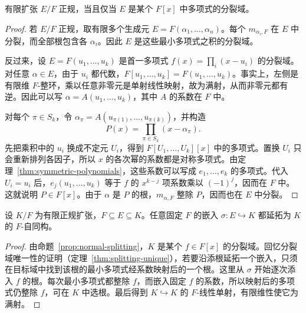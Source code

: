 \documentclass[lang=cn,a4paper,fontset=none,zihao=false,10pt,openany,twoside]{beautybook}
\numberwithin{algorithm}{chapter}
\begin{document}
\begin{proposition}[正规扩张的分裂域判别]\label{prop:normal-splitting}
有限扩张 $E/F$ 正规，当且仅当 $E$ 是某个 $F[x]$ 中多项式的分裂域。
\end{proposition}
\begin{proof}
若 $E/F$ 正规，取有限多个生成元 $E=F(\alpha_1,\dots,\alpha_n)$。每个 $m_{\alpha_i,F}$ 在 $E$ 中分裂，而全部根包含各 $\alpha_i$。因此 $E$ 是这些最小多项式之积的分裂域。

反过来，设 $E=F(u_1,\dots,u_k)$ 是首一多项式 $f(x)=\prod_i(x-u_i)$ 的分裂域。对任意 $\alpha\in E$，由于 $u_i$ 都代数，$F[u_1,\dots,u_k]=F(u_1,\dots,u_k)$。事实上，左侧是有限维 $F$-整环，乘以任意非零元是单射线性映射，故为满射，从而非零元都有逆。因此可以写 $\alpha=A(u_1,\dots,u_k)$，其中 $A$ 的系数在 $F$ 中。

对每个 $\pi\in S_k$，令 $\alpha_\pi=A(u_{\pi(1)},\dots,u_{\pi(k)})$，并构造
\[
 P(x)=\prod_{\pi\in S_k}(x-\alpha_\pi).
\]
先把乘积中的 $u_i$ 换成不定元 $U_i$，得到 $F[U_1,\dots,U_k][x]$ 中的多项式。置换 $U_i$ 只会重新排列各因子，所以 $x$ 的各次幂的系数都是对称多项式。由定理~\ref{thm:symmetric-polynomials}，这些系数可以写成 $e_1,\dots,e_k$ 的多项式。代入 $U_i=u_i$ 后，$e_j(u_1,\dots,u_k)$ 等于 $f$ 的 $x^{k-j}$ 项系数乘以 $(-1)^j$，因而在 $F$ 中。这就说明 $P\in F[x]$。由于 $\alpha$ 是 $P$ 的根，$m_{\alpha,F}$ 整除 $P$，因而也在 $E$ 中分裂。
\end{proof}

\begin{lemma}[分裂域中的嵌入延拓]\label{lem:galois-extend}
设 $K/F$ 为有限正规扩张，$F\subseteq E\subseteq K$。任意固定 $F$ 的嵌入 $\sigma:E\hookrightarrow K$ 都延拓为 $K$ 的 $F$-自同构。
\end{lemma}
\begin{proof}
由命题~\ref{prop:normal-splitting}，$K$ 是某个 $f\in F[x]$ 的分裂域。回忆分裂域唯一性的证明（定理~\ref{thm:splitting-unique}），若要沿添根延拓一个嵌入，只须在目标域中找到该根的最小多项式经系数映射后的一个根。这里从 $\sigma$ 开始逐次添入 $f$ 的根。每次最小多项式都整除 $f$，而嵌入固定 $f$ 的系数，所以映射后的多项式仍整除 $f$，可在 $K$ 中选根。最后得到 $K\hookrightarrow K$ 的 $F$-线性单射，有限维性使它为满射。
\end{proof}
\end{document}
